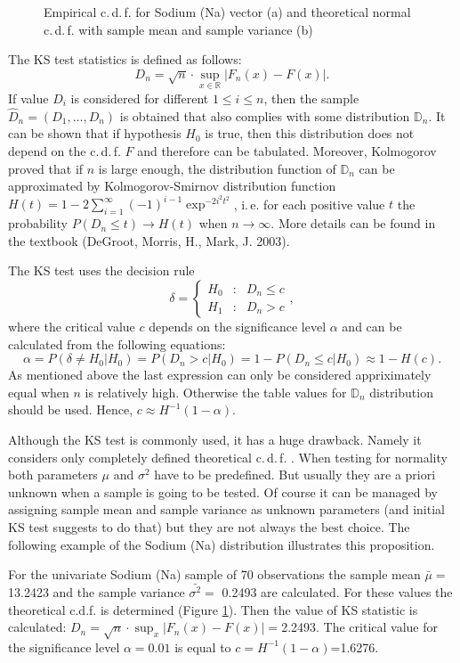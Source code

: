 \documentclass[a4paper, 12pt, titlepage, headsepline, listof = totoc, bibliography = totoc, numbers = noenddot]{scrartcl}
\newcommand{\ie}{i.\,e. }
\newcommand{\cdf}{c.\,d.\,f. }
\begin{document}
\begin{figure}[H]
\begin{subfigure}{.5\textwidth}
  \vspace{-1cm}
  \caption{}
  \label{fig:empiricTeorFunc}
\end{subfigure}
\caption{Empirical \cdf for Sodium (Na) vector (a) and theoretical normal \cdf with
sample mean and sample variance (b)}
\label{fig:commonFigureKStest}
\end{figure}

The KS test statistics is defined as follows:
\[D_n = \sqrt{n}\cdot \sup_{x \in \mathbb{R}}|F_n(x)-F(x)|.\]
If value $D_i$ is considered for different $1\le i\le n$, then the sample
$\hat{D}_n=(D_1,\dots,D_n)$ is obtained that also complies with some
distribution $\mathbb{D}_n$.
It can be shown that if hypothesis $H_0$ is true, then this distribution does not depend on the \cdf $F$
and therefore can be tabulated. Moreover, Kolmogorov proved that if $n$ is large
enough, the distribution function of $\mathbb{D}_n$ can be approximated by
Kolmogorov-Smirnov distribution function
$H(t)=1-2\sum_{i=1}^{\infty}(-1)^{i-1} \exp^{-2i^2t^2}$, \ie for each positive
value $t$ the probability $P(D_n\le t)\to H(t)$ when $n \to \infty$. More
details can be found in the textbook (DeGroot, Morris, H., Mark, J. 2003).

The KS test uses the decision rule
\[ \delta = 
\left\{
\begin{array}{rcl}
H_0&:& D_n\le c\\
H_1&:& D_n> c
\end{array}
\right.,
\]
where the critical value $c$ depends on the significance level $\alpha$ and
can be calculated from the following equations:
\[\alpha = P(\delta \ne H_0|H_0)=P(D_n>c|H_0)=1-P(D_n\le c|H_0)\approx 1-H(c).\]
As mentioned above the last expression can only be considered appriximately equal when $n$ is
relatively high. Otherwise the table values for $\mathbb{D}_n$ distribution
should be used. Hence, $c\approx H^{-1}(1-\alpha)$.

Although the KS test is commonly used, it has a huge drawback. Namely it
considers only completely defined theoretical \cdf. When testing for normality 
both parameters $\mu$ and $\sigma^2$ have to be predefined. But usually they are
a priori unknown when a sample is going to be tested. Of course it can be
managed by assigning sample mean and sample variance as unknown parameters (and
initial KS test suggests to do that) but they are not always the best choice.
The following example of the Sodium (Na) distribution illustrates this proposition. 

For the univariate Sodium (Na) sample of 70 observations the sample mean
$\bar{\mu}=$13.2423 and the sample variance $\bar{\sigma^2}=$
0.2493 are calculated. For these values the
theoretical c.d.f. is determined (Figure \ref{fig:empiricTeorFunc}). Then
the value of KS statistic is calculated: $D_n=\sqrt{n}\cdot
\sup_x|F_n(x)-F(x)|=$2.2493.
The critical value for the significance level $\alpha=0.01$ is equal to
$c=H^{-1}(1-\alpha)$=1.6276. 
\end{document}
